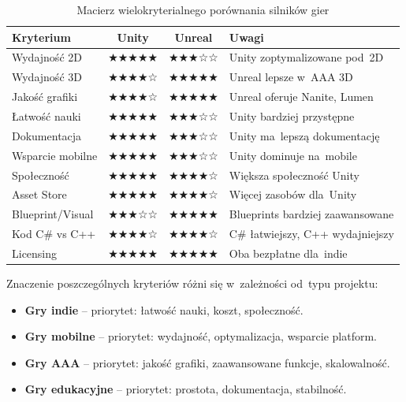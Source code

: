 \begin{table}[h!]
    \centering
    \caption{Macierz wielokryterialnego porównania silników gier}
    \label{tab:comparison-matrix}
    \begin{tabular}{|l|c|c|p{3cm}|}
        \hline
        \textbf{Kryterium} & \textbf{Unity} & \textbf{Unreal} & \textbf{Uwagi} \\
        \hline\hline
        Wydajność 2D & ★★★★★ & ★★★☆☆ & Unity zoptymalizowane pod~2D \\
        \hline
        Wydajność 3D & ★★★★☆ & ★★★★★ & Unreal lepsze w~AAA 3D \\
        \hline
        Jakość grafiki & ★★★★☆ & ★★★★★ & Unreal oferuje Nanite, Lumen \\
        \hline
        Łatwość nauki & ★★★★★ & ★★★☆☆ & Unity bardziej przystępne \\
        \hline
        Dokumentacja & ★★★★★ & ★★★☆☆ & Unity ma~lepszą dokumentację \\
        \hline
        Wsparcie mobilne & ★★★★★ & ★★★☆☆ & Unity dominuje na~mobile \\
        \hline
        Społeczność & ★★★★★ & ★★★★☆ & Większa społeczność Unity \\
        \hline
        Asset Store & ★★★★★ & ★★★★☆ & Więcej zasobów dla~Unity \\
        \hline
        Blueprint/Visual & ★★★☆☆ & ★★★★★ & Blueprints bardziej zaawansowane \\
        \hline
        Kod C\# vs C++ & ★★★★☆ & ★★★★☆ & C\# łatwiejszy, C++ wydajniejszy \\
        \hline
        Licensing & ★★★★★ & ★★★★★ & Oba bezpłatne dla~indie \\
        \hline
    \end{tabular}
\end{table}


Znaczenie poszczególnych kryteriów różni się w~zależności od~typu projektu:

\begin{itemize}
    \item \textbf{Gry indie} -- priorytet: łatwość nauki, koszt, społeczność.
    \item \textbf{Gry mobilne} -- priorytet: wydajność, optymalizacja, wsparcie platform.
    \item \textbf{Gry AAA} -- priorytet: jakość grafiki, zaawansowane funkcje, skalowalność.
    \item \textbf{Gry edukacyjne} -- priorytet: prostota, dokumentacja, stabilność.
\end{itemize}

